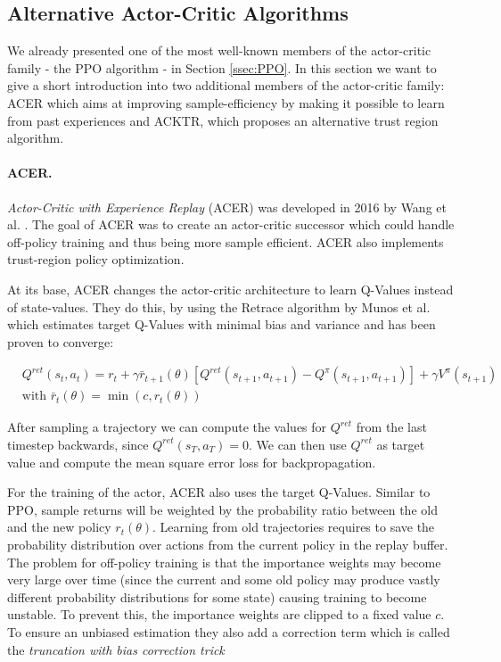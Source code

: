 \subsection{Alternative Actor-Critic Algorithms} \label{ssec:AlternativeCombinedMethods}
We already presented one of the most well-known members of the actor-critic family - the PPO algorithm - in Section \ref{ssec:PPO}. In this section we want to give a short introduction into two additional members of the actor-critic family: ACER which aims at improving sample-efficiency by making it possible to learn from past experiences and ACKTR, which proposes an alternative trust region algorithm. 

\paragraph{ACER.}
\textit{Actor-Critic with Experience Replay} (ACER) was developed in 2016 by Wang et al. \cite{wang2016sample}. The goal of ACER was to create an actor-critic successor which could handle off-policy training and thus being more sample efficient. ACER also implements trust-region policy optimization.

At its base, ACER changes the actor-critic architecture to learn Q-Values instead of state-values. They do this, by using the Retrace algorithm by Munos et al. \cite{munos2016safe} which estimates target Q-Values with minimal bias and variance and has been proven to converge:

\begin{align*}
  &Q^{ret}(s_t, a_t) = r_t + \gamma \bar{r}_{t+1}(\theta) \left[Q^{ret}(s_{t+1}, a_{t+1}) - Q^\pi(s_{t+1}, a_{t+1})\right] + \gamma V^\pi(s_{t+1}) \\
  &\text{with } \bar{r}_t(\theta) = \min(c, r_t(\theta))
\end{align*}

After sampling a trajectory we can compute the values for $Q^{ret}$ from the last timestep backwards, since $Q^{ret}(s_T, a_T) = 0$. We can then use $Q^{ret}$ as target value and compute the mean square error loss for backpropagation. 

For the training of the actor, ACER also uses the target Q-Values. Similar to PPO, sample returns will be weighted by the probability ratio between the old and the new policy $r_t(\theta)$. Learning from old trajectories requires to save the probability distribution over actions from the current policy in the replay buffer. The problem for off-policy training is that the importance weights may become very large over time (since the current and some old policy may produce vastly different probability distributions for some state) causing training to become unstable. To prevent this, the importance weights are clipped to a fixed value $c$. To ensure an unbiased estimation they also add a correction term which is called the \textit{truncation with bias correction trick} 

